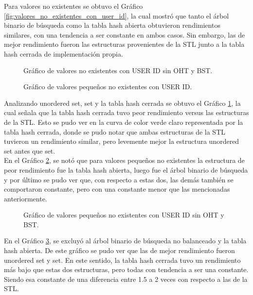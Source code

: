 \begin{multicols}{2}
Para valores no existentes se obtuvo el Gráfico \ref{fig:valores_no_existentes_con_user_id}, la cual mostró que tanto el árbol binario de búsqueda como la tabla hash abierta obtuvieron rendimientos similares, con una tendencia a ser constante en ambos casos. Sin embargo, las de mejor rendimiento fueron las estructuras provenientes de la STL junto a la tabla hash cerrada de implementación propia.

\begin{figure}[H]
    \centering
    
    \caption{Gráfico de valores no existentes con USER ID sin OHT y BST.}
    \label{fig:valores_no_existentes_con_user_id_sin_OHT_BST}
\end{figure}

\begin{figure}[H]
    \centering
    
    \caption{Gráfico de valores pequeños no existentes con USER ID.}
    \label{fig:valores_pequeños_no_existentes_con_user_id}
\end{figure}

Analizando unordered set, set y la tabla hash cerrada se obtuvo el Gráfico \ref{fig:valores_no_existentes_con_user_id_sin_OHT_BST}, la cual señala que la tabla hash cerrada tuvo peor rendimiento versus las estructuras de la STL. Esto se pudo ver en la curva de color verde claro representada por la tabla hash cerrada, donde se pudo notar que ambas estructuras de la STL tuvieron un rendimiento similar, pero levemente mejor la estructura unordered set antes que set.\\
En el Gráfico \ref{fig:valores_pequeños_no_existentes_con_user_id}, se notó que para valores pequeños no existentes la estructura de peor rendimiento fue la tabla hash abierta, luego fue el árbol binario de búsqueda y por último se pudo ver que, con respecto a estas dos, las demás también se comportaron constante, pero con una constante menor que las mencionadas anteriormente.
\begin{figure}[H]
    \centering
    
    \caption{Gráfico de valores pequeños no existentes con USER ID sin OHT y BST.}
    \label{fig:valores_pequeños_no_existentes_con_user_id_sin_OHT_BST}
\end{figure}

En el Gráfico \ref{fig:valores_pequeños_no_existentes_con_user_id_sin_OHT_BST}, se excluyó al árbol binario de búsqueda no balanceado y la tabla hash abierta. De este gráfico se pudo ver que las de mejor rendimiento fueron unordered set y set. En este sentido, la tabla hash cerrada tuvo un rendimiento más bajo que estas dos estructuras, pero todas con tendencia a ser una constante. Siendo esa constante de una diferencia entre 1.5 a 2 veces con respecto a las de la STL.



\end{multicols}
